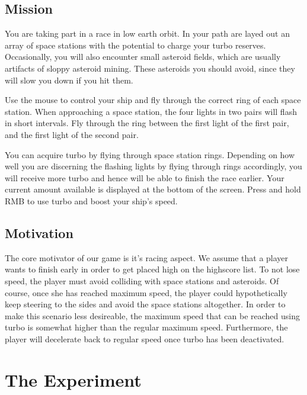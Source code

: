 \documentclass[11pt,a4paper]{article}
\begin{document}
    	\subsection{Mission}
        
        	You are taking part in a race in low earth orbit. In your path are layed out an array of space stations with the potential to charge your turbo reserves. Occasionally, you will also encounter small asteroid fields, which are usually artifacts of sloppy asteroid mining. These asteroids you should avoid, since they will slow you down if you hit them.
        
        	Use the mouse to control your ship and fly through the correct ring of each space station. When approaching a space station, the four lights in two pairs will flash in short intervals. Fly through the ring between the first light of the first pair, and the first light of the second pair.
        
        	You can acquire turbo by flying through space station rings. Depending on how well you are discerning the flashing lights by flying through rings accordingly, you will receive more turbo and hence will be able to finish the race earlier. Your current amount available is displayed at the bottom of the screen. Press and hold RMB to use turbo and boost your ship's speed.
            
        \subsection{Motivation}
        
        	The core motivator of our game is it's racing aspect. We assume that a player wants to finish early in order to get placed high on the highscore list. To not lose speed, the player must avoid colliding with space stations and asteroids. Of course, once she has reached maximum speed, the player could hypothetically keep steering to the sides and avoid the space stations altogether. In order to make this scenario less desireable, the maximum speed that can be reached using turbo is somewhat higher than the regular maximum speed. Furthermore, the player will decelerate back to regular speed once turbo has been deactivated.
            
            
            
    \section{The Experiment}
    
\end{document}
